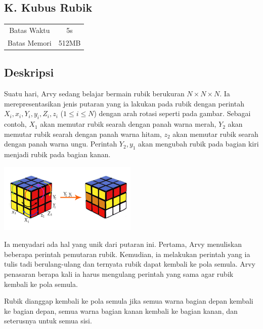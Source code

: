 \documentclass{article}
\begin{document}
\begin{center}
    \section*{K. Kubus Rubik}

    \begin{tabular}{ | c c | }
        \hline
        Batas Waktu  & 5s \\
        Batas Memori & 512MB \\
        \hline
    \end{tabular}
\end{center}

\subsection*{Deskripsi}

Suatu hari, Arvy sedang belajar bermain rubik berukuran $N \times N \times N$.
Ia merepresentasikan jenis putaran yang ia lakukan pada rubik dengan perintah $X_i, x_i, Y_i, y_i, Z_i, z_i$ ($1 \leq i \leq N$) dengan arah rotasi seperti pada gambar.
Sebagai contoh, $X_1$ akan memutar rubik searah dengan panah warna merah, $Y_2$ akan memutar rubik searah dengan panah warna hitam, $z_2$ akan memutar rubik searah dengan panah warna ungu.
Perintah $Y_2, y_1$ akan mengubah rubik pada bagian kiri menjadi rubik pada bagian kanan.

\begin{center}
    \includegraphics[width=250px]{rubic}
\end{center}

Ia menyadari ada hal yang unik dari putaran ini.
Pertama, Arvy menuliskan beberapa perintah pemutaran rubik.
Kemudian, ia melakukan perintah yang ia tulis tadi berulang-ulang dan ternyata rubik dapat kembali ke pola semula.
Arvy penasaran berapa kali ia harus mengulang perintah yang sama agar rubik kembali ke pola semula.

Rubik dianggap kembali ke pola semula jika semua warna bagian depan kembali ke bagian depan, semua warna bagian kanan kembali ke bagian kanan, dan seterusnya untuk semua sisi.
\end{document}
